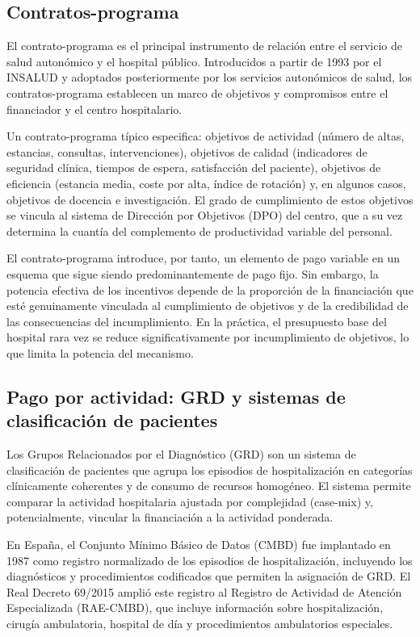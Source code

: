 \subsection{Contratos-programa}

El contrato-programa es el principal instrumento de relación entre el servicio de salud autonómico y el hospital público. Introducidos a partir de 1993 por el INSALUD y adoptados posteriormente por los servicios autonómicos de salud, los contratos-programa establecen un marco de objetivos y compromisos entre el financiador y el centro hospitalario.

Un contrato-programa típico especifica: objetivos de actividad (número de altas, estancias, consultas, intervenciones), objetivos de calidad (indicadores de seguridad clínica, tiempos de espera, satisfacción del paciente), objetivos de eficiencia (estancia media, coste por alta, índice de rotación) y, en algunos casos, objetivos de docencia e investigación. El grado de cumplimiento de estos objetivos se vincula al sistema de Dirección por Objetivos (DPO) del centro, que a su vez determina la cuantía del complemento de productividad variable del personal.

El contrato-programa introduce, por tanto, un elemento de pago variable en un esquema que sigue siendo predominantemente de pago fijo. Sin embargo, la potencia efectiva de los incentivos depende de la proporción de la financiación que esté genuinamente vinculada al cumplimiento de objetivos y de la credibilidad de las consecuencias del incumplimiento. En la práctica, el presupuesto base del hospital rara vez se reduce significativamente por incumplimiento de objetivos, lo que limita la potencia del mecanismo.

\subsection{Pago por actividad: GRD y sistemas de clasificación de pacientes}

Los Grupos Relacionados por el Diagnóstico (GRD) son un sistema de clasificación de pacientes que agrupa los episodios de hospitalización en categorías clínicamente coherentes y de consumo de recursos homogéneo. El sistema permite comparar la actividad hospitalaria ajustada por complejidad (case-mix) y, potencialmente, vincular la financiación a la actividad ponderada.

En España, el Conjunto Mínimo Básico de Datos (CMBD) fue implantado en 1987 como registro normalizado de los episodios de hospitalización, incluyendo los diagnósticos y procedimientos codificados que permiten la asignación de GRD. El Real Decreto 69/2015 amplió este registro al Registro de Actividad de Atención Especializada (RAE-CMBD), que incluye información sobre hospitalización, cirugía ambulatoria, hospital de día y procedimientos ambulatorios especiales.

